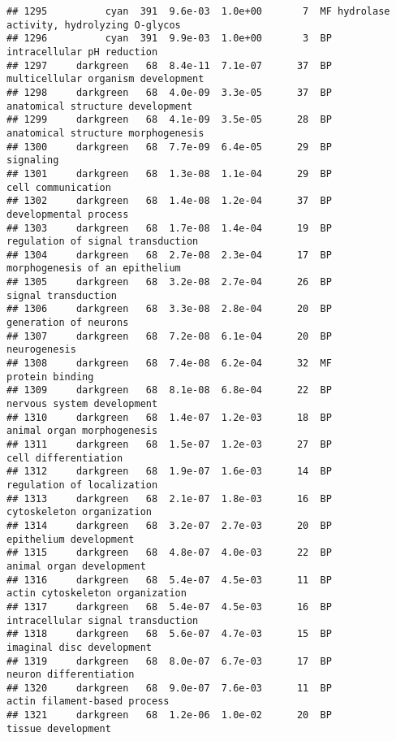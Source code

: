 \documentclass[]{article}
\begin{document}
\begin{verbatim}
## 1295          cyan  391  9.6e-03  1.0e+00       7  MF hydrolase activity, hydrolyzing O-glycos
## 1296          cyan  391  9.9e-03  1.0e+00       3  BP               intracellular pH reduction
## 1297     darkgreen   68  8.4e-11  7.1e-07      37  BP       multicellular organism development
## 1298     darkgreen   68  4.0e-09  3.3e-05      37  BP         anatomical structure development
## 1299     darkgreen   68  4.1e-09  3.5e-05      28  BP       anatomical structure morphogenesis
## 1300     darkgreen   68  7.7e-09  6.4e-05      29  BP                                signaling
## 1301     darkgreen   68  1.3e-08  1.1e-04      29  BP                       cell communication
## 1302     darkgreen   68  1.4e-08  1.2e-04      37  BP                    developmental process
## 1303     darkgreen   68  1.7e-08  1.4e-04      19  BP        regulation of signal transduction
## 1304     darkgreen   68  2.7e-08  2.3e-04      17  BP           morphogenesis of an epithelium
## 1305     darkgreen   68  3.2e-08  2.7e-04      26  BP                      signal transduction
## 1306     darkgreen   68  3.3e-08  2.8e-04      20  BP                    generation of neurons
## 1307     darkgreen   68  7.2e-08  6.1e-04      20  BP                             neurogenesis
## 1308     darkgreen   68  7.4e-08  6.2e-04      32  MF                          protein binding
## 1309     darkgreen   68  8.1e-08  6.8e-04      22  BP               nervous system development
## 1310     darkgreen   68  1.4e-07  1.2e-03      18  BP               animal organ morphogenesis
## 1311     darkgreen   68  1.5e-07  1.2e-03      27  BP                     cell differentiation
## 1312     darkgreen   68  1.9e-07  1.6e-03      14  BP               regulation of localization
## 1313     darkgreen   68  2.1e-07  1.8e-03      16  BP                cytoskeleton organization
## 1314     darkgreen   68  3.2e-07  2.7e-03      20  BP                   epithelium development
## 1315     darkgreen   68  4.8e-07  4.0e-03      22  BP                 animal organ development
## 1316     darkgreen   68  5.4e-07  4.5e-03      11  BP          actin cytoskeleton organization
## 1317     darkgreen   68  5.4e-07  4.5e-03      16  BP        intracellular signal transduction
## 1318     darkgreen   68  5.6e-07  4.7e-03      15  BP                imaginal disc development
## 1319     darkgreen   68  8.0e-07  6.7e-03      17  BP                   neuron differentiation
## 1320     darkgreen   68  9.0e-07  7.6e-03      11  BP             actin filament-based process
## 1321     darkgreen   68  1.2e-06  1.0e-02      20  BP                       tissue development

\end{verbatim}
\end{document}

